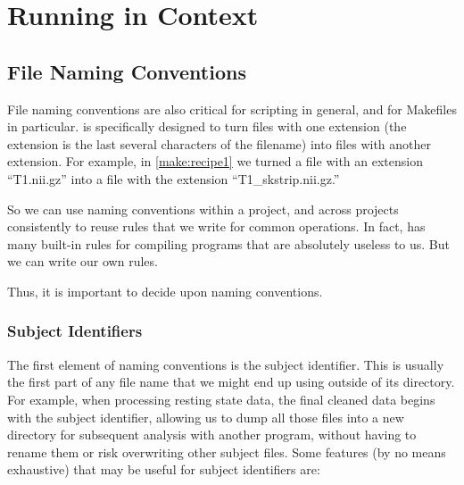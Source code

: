 \chapter{Running \maken{} in Context}
\label{chap:context}

\section{File Naming Conventions}
\label{sec:naming}

File naming conventions are also critical for scripting in general, and for Makefiles in particular. \maken{} is specifically designed to turn files with one extension (the extension is the last several characters of the filename) into files with another extension. For example, in \autoref{make:recipe1} we turned a file with an extension ``T1.nii.gz'' into a file with the extension ``T1_skstrip.nii.gz.'' 

So we can use naming conventions within a project, and across projects consistently to reuse rules that we write for common operations. In fact, \maken{} has many built-in rules for compiling programs that are absolutely useless to us. But we can write our own rules.

Thus, it is important to decide upon naming conventions. 

\subsection{Subject Identifiers}

The first element of naming conventions is the subject identifier. This is usually the first part of any file name that we might end up using outside of its directory. For example, when processing resting state data, the final cleaned data begins with the subject identifier, allowing us to dump all those files into a new directory for subsequent analysis with another program, without having to rename them or risk overwriting other subject files. Some features (by no means exhaustive) that may be useful for subject identifiers are:

